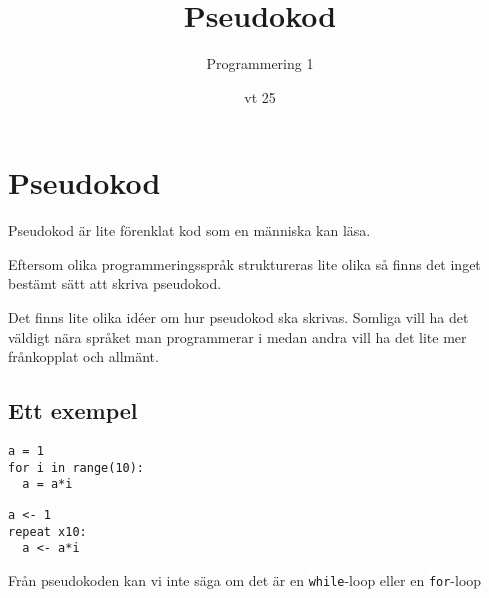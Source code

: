 \documentclass[aspectratio=169]{beamer}
\newcommand{\code}[1]{\colorbox{white}{\lstinline{#1}}}
\begin{document}


\title{Pseudokod}
\date{vt 25}
\author{Programmering 1}

\maketitle

\section{Pseudokod}

\begin{frame}
Pseudokod är lite förenklat kod som en människa kan läsa.

Eftersom olika programmeringsspråk struktureras lite olika så finns det inget bestämt sätt att skriva pseudokod.
\end{frame}

\begin{frame}
Det finns lite olika idéer om hur pseudokod ska skrivas. Somliga vill ha det väldigt nära språket man programmerar i medan andra vill ha det lite mer frånkopplat och allmänt.
\end{frame}

\subsection{Ett exempel}

\begin{frame}[fragile]

\begin{lstlisting}
a = 1
for i in range(10):
  a = a*i
\end{lstlisting}

\begin{lstlisting}
a <- 1
repeat x10:
  a <- a*i
\end{lstlisting}

Från pseudokoden kan vi inte säga om det är en \code{while}-loop eller en \code{for}-loop

\end{frame}
\end{document}
